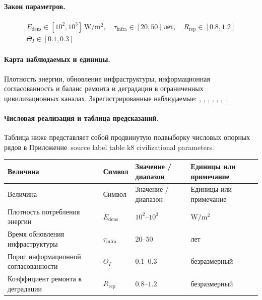 \paragraph{Закон параметров.}
\[
\begin{gathered} E_{\mathrm{dens}} \in [10^2,10^3]\,\mathrm{W/m^2},\quad \tau_{\mathrm{infra}} \in [20,50]\,\mathrm{лет},\quad R_{\mathrm{rep}} \in [0.8,1.2] \\ \Theta_I \in [0.1,0.3] \end{gathered}
\]

\paragraph{Карта наблюдаемых и единицы.}
Плотность энергии, обновление инфраструктуры, информационная согласованность и баланс ремонта и деградации в ограниченных цивилизационных каналах.
Зарегистрированные наблюдаемые: , \allowbreak {}, \allowbreak {}, \allowbreak {}, \allowbreak {}, \allowbreak {}, \allowbreak {}.

\paragraph{Числовая реализация и таблица предсказаний.}
Таблица ниже представляет собой продвинутую подвыборку числовых опорных рядов в Приложение~source label table k8 civilizational parameters.
\begin{longtable}{@{}L{0.27\textwidth}L{0.15\textwidth}L{0.24\textwidth}L{0.16\textwidth}@{}}
\toprule
Величина & Символ & Значение / диапазон & Единицы или примечание \\
\midrule
\endfirsthead
\toprule
Величина & Символ & Значение / диапазон & Единицы или примечание \\
\midrule
\endhead
Плотность потребления энергии & $\scriptstyle E_{\mathrm{dens}}$ & $10^2\text{--}10^3$ & $\mathrm{W/m^2}$ \\
Время обновления инфраструктуры & $\scriptstyle \tau_{\mathrm{infra}}$ & $20\text{--}50$ & лет \\
Порог информационной согласованности & $\scriptstyle \Theta_I$ & $0.1\text{--}0.3$ & безразмерный \\
Коэффициент ремонта к деградации & $\scriptstyle R_{\mathrm{rep}}$ & $0.8\text{--}1.2$ & безразмерный \\
\bottomrule
\end{longtable}

